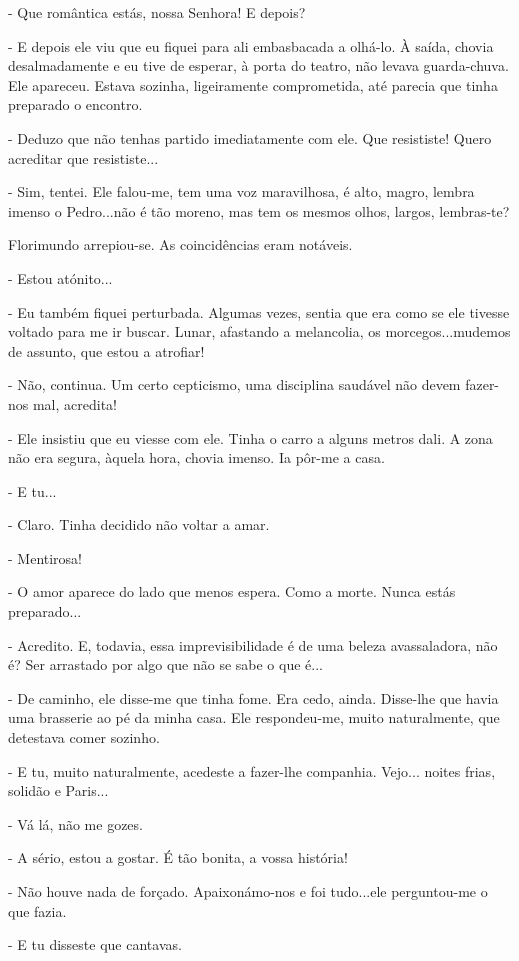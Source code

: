 - Que romântica estás, nossa Senhora! E depois?

- E depois ele viu que eu fiquei para ali embasbacada a olhá-lo. À
saída, chovia desalmadamente e eu tive de esperar, à porta do teatro,
não levava guarda-chuva. Ele apareceu. Estava sozinha, ligeiramente
comprometida, até parecia que tinha preparado o encontro.

- Deduzo que não tenhas partido imediatamente com ele. Que resististe!
Quero acreditar que resististe...

- Sim, tentei. Ele falou-me, tem uma voz maravilhosa, é alto, magro,
lembra imenso o Pedro...não é tão moreno, mas tem os mesmos olhos,
largos, lembras-te?

Florimundo arrepiou-se. As coincidências eram notáveis.

- Estou atónito...

- Eu também fiquei perturbada. Algumas vezes, sentia que era como se ele
tivesse voltado para me ir buscar. Lunar, afastando a melancolia, os
morcegos...mudemos de assunto, que estou a atrofiar!

- Não, continua. Um certo cepticismo, uma disciplina saudável não devem
fazer-nos mal, acredita!

- Ele insistiu que eu viesse com ele. Tinha o carro a alguns metros
dali. A zona não era segura, àquela hora, chovia imenso. Ia pôr-me a
casa.

- E tu...

- Claro. Tinha decidido não voltar a amar.

- Mentirosa!

- O amor aparece do lado que menos espera. Como a morte. Nunca estás
preparado...

- Acredito. E, todavia, essa imprevisibilidade é de uma beleza
avassaladora, não é? Ser arrastado por algo que não se sabe o que é...

- De caminho, ele disse-me que tinha fome. Era cedo, ainda. Disse-lhe
que havia uma brasserie ao pé da minha casa. Ele respondeu-me, muito
naturalmente, que detestava comer sozinho.

- E tu, muito naturalmente, acedeste a fazer-lhe companhia. Vejo...
noites frias, solidão e Paris...

- Vá lá, não me gozes.

- A sério, estou a gostar. É tão bonita, a vossa história!

- Não houve nada de forçado. Apaixonámo-nos e foi tudo...ele
perguntou-me o que fazia.

- E tu disseste que cantavas.

